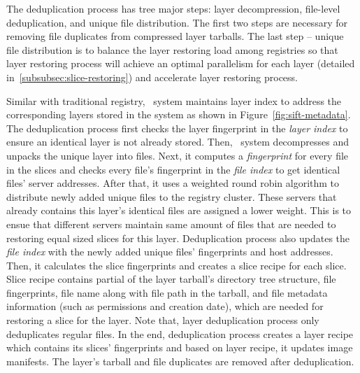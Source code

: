 The deduplication process has tree major steps: layer decompression, file-level deduplication,
and unique file distribution. 
The first two steps are necessary for removing file duplicates from compressed layer tarballs.
The last step -- unique file distribution is to balance the layer restoring load among registries so that 
layer restoring process will achieve an optimal parallelism for each layer (detailed in~\cref{subsubsec:slice-restoring}) 
and 
accelerate layer restoring process. 

%
Similar with traditional registry, 
\dedupname~system maintains layer index to address the corresponding layers stored in the system
as shown in Figure~\ref{fig:sift-metadata}.
The deduplication process first checks the layer fingerprint in the \emph{layer index} to ensure 
an identical layer is not already stored. Then,
\dedupname~system decompresses and unpacks the unique layer into files.
Next, 
it computes a \emph{fingerprint} for every file in the slices
and checks every file's fingerprint in the \emph{file index} to get identical files' server addresses.
After that, it uses a weighted round robin algorithm to distribute newly added 
unique files to the registry cluster. These servers that already contains this layer's identical files
are assigned a lower weight. 
This is to ensue that different servers maintain same amount of files that are needed to restoring equal sized 
slices for this layer.
Deduplication process also 
updates the \emph{file index} with the newly added unique files' fingerprints and host addresses.   
Then, it calculates the slice fingerprints and creates a slice recipe for each slice.
Slice recipe contains partial of the layer tarball's directory tree structure, file fingerprints, file name along with file path in the tarball, and file metadata information 
(such as permissions and creation date), which are needed for restoring a slice for the layer. 
Note that, layer deduplication process only deduplicates regular files.
In the end, deduplication process creates a layer recipe which contains its slices' fingerprints and 
based on layer recipe, it updates image manifests.
The layer's tarball and file duplicates are removed after deduplication.

